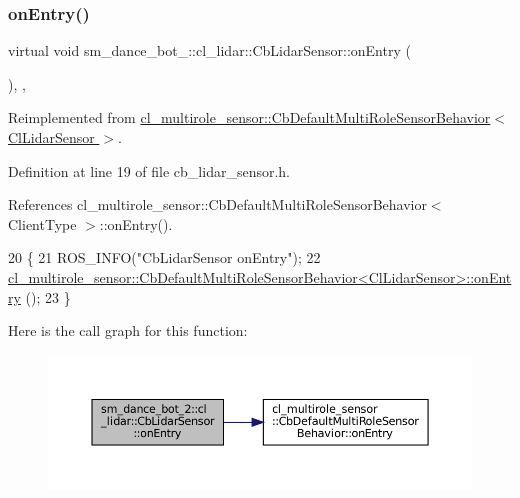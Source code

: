 \subsubsection{\texorpdfstring{on\+Entry()}{onEntry()}}
{\footnotesize\ttfamily virtual void sm\+\_\+dance\+\_\+bot\+\_\+::cl\+\_\+lidar\+::\+Cb\+Lidar\+Sensor\+::on\+Entry (\begin{DoxyParamCaption}{ }\end{DoxyParamCaption})\hspace{0.3cm}{\ttfamily [inline]}, {\ttfamily [override]}, {\ttfamily [virtual]}}



Reimplemented from \hyperlink{classcl__multirole__sensor_1_1CbDefaultMultiRoleSensorBehavior_a5ac29f93cc91e23715f51ade94467cae}{cl\+\_\+multirole\+\_\+sensor\+::\+Cb\+Default\+Multi\+Role\+Sensor\+Behavior$<$ Cl\+Lidar\+Sensor $>$}.



Definition at line 19 of file cb\+\_\+lidar\+\_\+sensor.\+h.



References cl\+\_\+multirole\+\_\+sensor\+::\+Cb\+Default\+Multi\+Role\+Sensor\+Behavior$<$ Client\+Type $>$\+::on\+Entry().


\begin{DoxyCode}
20   \{
21     ROS\_INFO(\textcolor{stringliteral}{"CbLidarSensor onEntry"});
22     
      \hyperlink{classcl__multirole__sensor_1_1CbDefaultMultiRoleSensorBehavior_a5ac29f93cc91e23715f51ade94467cae}{cl\_multirole\_sensor::CbDefaultMultiRoleSensorBehavior<ClLidarSensor>::onEntry}
      ();
23   \}
\end{DoxyCode}
Here is the call graph for this function\+:
\nopagebreak
\begin{figure}[H]
\begin{center}
\leavevmode
\includegraphics[width=350pt]{structsm__dance__bot__2_1_1cl__lidar_1_1CbLidarSensor_aad4085c114dd98c5e857d1a71c0309f8_cgraph}
\end{center}
\end{figure}
\mbox{\label{structsm__dance__bot__2_1_1cl__lidar_1_1CbLidarSensor_a62e47011ef05a3d475da88c7c17a9861}} 
